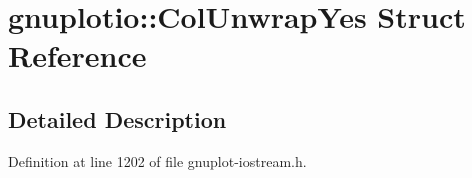 \hypertarget{structgnuplotio_1_1_col_unwrap_yes}{}\section{gnuplotio\+:\+:Col\+Unwrap\+Yes Struct Reference}
\label{structgnuplotio_1_1_col_unwrap_yes}


\subsection{Detailed Description}


Definition at line 1202 of file gnuplot-\/iostream.\+h.

